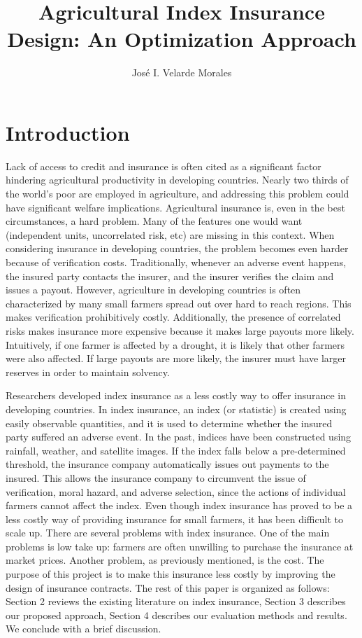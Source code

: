 \documentclass[11pt]{article}
\title{Agricultural Index Insurance Design: An Optimization Approach}
\author{José I. Velarde Morales}
\begin{document}
\maketitle

\section{Introduction}
Lack of access to credit and insurance is often cited as a significant factor hindering agricultural productivity in developing countries. Nearly two thirds of the world's poor are employed in agriculture, and addressing this problem could have significant welfare implications. Agricultural insurance is, even in the best circumstances, a hard problem. Many of the features one would want (independent units, uncorrelated risk, etc) are missing in this context. When considering insurance in developing countries, the problem becomes even harder because of verification costs. Traditionally, whenever an adverse event happens, the insured party contacts the insurer, and the insurer verifies the claim and issues a payout. However, agriculture in developing countries is often characterized by many small farmers spread out over hard to reach regions. This makes verification prohibitively costly. Additionally, the presence of correlated risks makes insurance more expensive because it makes large payouts more likely. Intuitively, if one farmer is affected by a drought, it is likely that other farmers were also affected. If large payouts are more likely, the insurer must have larger reserves in order to maintain solvency. 

Researchers developed index insurance as a less costly way to offer insurance in developing countries. In index insurance, an index (or statistic) is created using easily observable quantities, and it is used to determine whether the insured party suffered an adverse event. In the past, indices have been constructed using rainfall, weather, and satellite images. If the index falls below a pre-determined threshold, the insurance company automatically issues out payments to the insured. This allows the insurance company to circumvent the issue of verification, moral hazard, and adverse selection, since the actions of individual farmers cannot affect the index. Even though index insurance has proved to be a less costly way of providing insurance for small farmers, it has been difficult to scale up. There are several problems with index insurance. One of the main problems is low take up: farmers are often unwilling to purchase the insurance at market prices. Another problem, as previously mentioned, is the cost. The purpose of this project is to make this insurance less costly by improving the design of insurance contracts. The rest of this paper is organized as follows: Section 2 reviews the existing literature on index insurance, Section 3 describes our proposed approach, Section 4 describes our evaluation methods and results. We conclude with a brief discussion. 
\end{document}

